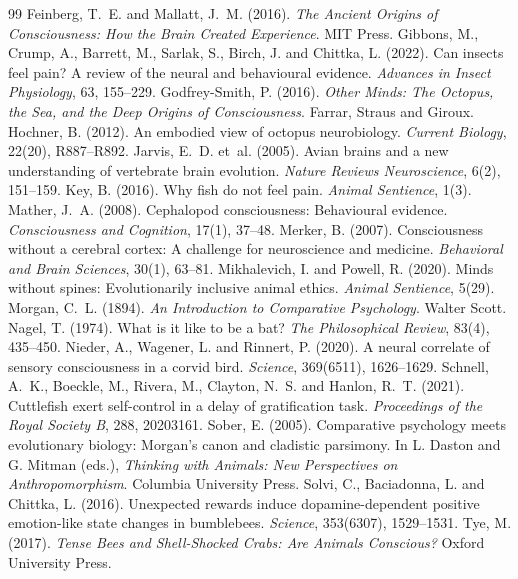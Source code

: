 \documentclass{situationist-preprint}
\begin{document}
\begin{thebibliography}{99}
 Feinberg, T.~E. and Mallatt, J.~M. (2016). \emph{The Ancient Origins of Consciousness: How the Brain Created Experience}. MIT Press.
 Gibbons, M., Crump, A., Barrett, M., Sarlak, S., Birch, J. and Chittka, L. (2022). Can insects feel pain? A review of the neural and behavioural evidence. \emph{Advances in Insect Physiology}, 63, 155--229.
 Godfrey-Smith, P. (2016). \emph{Other Minds: The Octopus, the Sea, and the Deep Origins of Consciousness}. Farrar, Straus and Giroux.
 Hochner, B. (2012). An embodied view of octopus neurobiology. \emph{Current Biology}, 22(20), R887--R892.
 Jarvis, E.~D. et~al. (2005). Avian brains and a new understanding of vertebrate brain evolution. \emph{Nature Reviews Neuroscience}, 6(2), 151--159.
 Key, B. (2016). Why fish do not feel pain. \emph{Animal Sentience}, 1(3).
 Mather, J.~A. (2008). Cephalopod consciousness: Behavioural evidence. \emph{Consciousness and Cognition}, 17(1), 37--48.
 Merker, B. (2007). Consciousness without a cerebral cortex: A challenge for neuroscience and medicine. \emph{Behavioral and Brain Sciences}, 30(1), 63--81.
 Mikhalevich, I. and Powell, R. (2020). Minds without spines: Evolutionarily inclusive animal ethics. \emph{Animal Sentience}, 5(29).
 Morgan, C.~L. (1894). \emph{An Introduction to Comparative Psychology}. Walter Scott.
 Nagel, T. (1974). What is it like to be a bat? \emph{The Philosophical Review}, 83(4), 435--450.
 Nieder, A., Wagener, L. and Rinnert, P. (2020). A neural correlate of sensory consciousness in a corvid bird. \emph{Science}, 369(6511), 1626--1629.
 Schnell, A.~K., Boeckle, M., Rivera, M., Clayton, N.~S. and Hanlon, R.~T. (2021). Cuttlefish exert self-control in a delay of gratification task. \emph{Proceedings of the Royal Society B}, 288, 20203161.
 Sober, E. (2005). Comparative psychology meets evolutionary biology: Morgan's canon and cladistic parsimony. In L. Daston and G. Mitman (eds.), \emph{Thinking with Animals: New Perspectives on Anthropomorphism}. Columbia University Press.
 Solvi, C., Baciadonna, L. and Chittka, L. (2016). Unexpected rewards induce dopamine-dependent positive emotion-like state changes in bumblebees. \emph{Science}, 353(6307), 1529--1531.
 Tye, M. (2017). \emph{Tense Bees and Shell-Shocked Crabs: Are Animals Conscious?} Oxford University Press.
\end{thebibliography}
\end{document}
